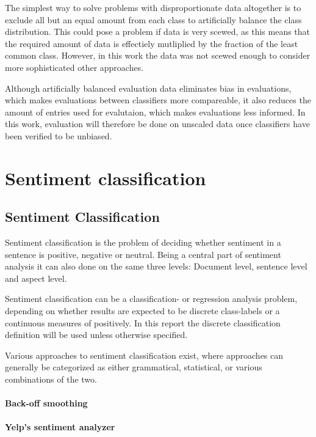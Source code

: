 \documentclass[a4paper,11pt]{kth-mag}
\begin{document}
The simplest way to solve problems with disproportionate data altogether is to exclude all but an equal amount from each class to artificially balance the class distribution. This could pose a problem if data is very scewed, as this means that the required amount of data is effectiely mutliplied by the fraction of the least common class. However, in this work the data was not scewed enough to consider more sophisticated other approaches.

Although artificially balanced evaluation data eliminates bias in evaluations, which makes evaluations between classifiers more compareable, it also reduces the amount of entries used for evalutaion, which makes evaluations less informed. In this work, evaluation will therefore be done on unscaled data once classifiers have been verified to be unbiased.


\part{Sentiment classification}

\chapter{Sentiment Classification}
Sentiment classification is the problem of deciding whether sentiment in a sentence is positive, negative or neutral\cite{nlp_book}. Being a central part of sentiment analysis it can also done on the same three levels: Document level, sentence level and aspect level.

Sentiment classification can be a classification- or regression analysis problem\cite{liu2012sentiment}, depending on whether results are expected to be discrete class-labels or a continuous measures of positively. In this report the discrete classification definition will be used unless otherwise specified.

Various approaches to sentiment classification exist, where approaches can generally be categorized as either grammatical\cite{todo}, statistical\cite{todo}, or various combinations of the two.


\subsection{Back-off smoothing}

\subsection{Yelp's sentiment analyzer}
\end{document}
